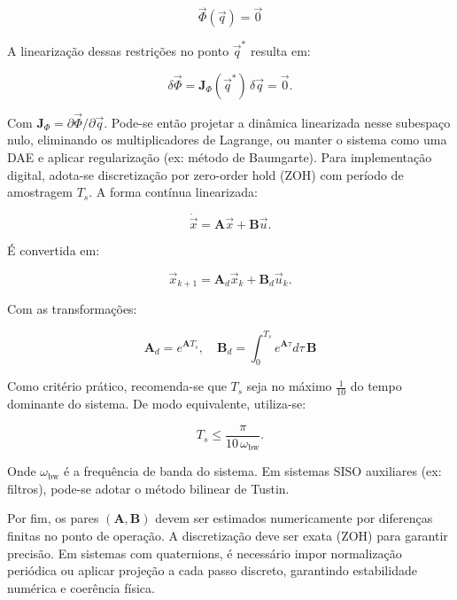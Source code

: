 \begin{equation}
\vec{\Phi}(\vec{q}) = \vec{0}
\label{eq:vinculo_phi}
\end{equation}

A linearização dessas restrições no ponto $\vec{q}^*$ resulta em:

\begin{equation}
\delta \vec{\Phi} = \mathbf{J}_{\Phi}(\vec{q}^*) \, \delta \vec{q} = \vec{0}.
\label{eq:linearizacao_vinculo}
\end{equation}

Com $\mathbf{J}_{\Phi} = \partial \vec{\Phi} / \partial \vec{q}$. Pode-se então projetar a dinâmica linearizada nesse subespaço nulo, eliminando os multiplicadores de Lagrange, ou manter o sistema como uma DAE e aplicar regularização (ex: método de Baumgarte).
Para implementação digital, adota-se discretização por zero-order hold (ZOH) com período de amostragem $T_s$. A forma contínua linearizada:

\begin{equation}
\dot{\vec{x}} = \mathbf{A} \vec{x} + \mathbf{B} \vec{u}.
\label{eq:sistema_linear_continuo}
\end{equation}

É convertida em:

\begin{equation}
\vec{x}_{k+1} = \mathbf{A}_d \vec{x}_k + \mathbf{B}_d \vec{u}_k.
\label{eq:sistema_discreto}
\end{equation}

Com as transformações:

\begin{equation}
\mathbf{A}_d = e^{\mathbf{A} T_s}, \quad \mathbf{B}_d = \int_0^{T_s} e^{\mathbf{A} \tau} d\tau \, \mathbf{B}
\label{eq:discretizacao_AdBd}
\end{equation}

Como critério prático, recomenda-se que $T_s$ seja no máximo $\frac{1}{10}$ do tempo dominante do sistema. De modo equivalente, utiliza-se:

\begin{equation}
T_s \leq \frac{\pi}{10 \, \omega_{\text{bw}}}.
\label{eq:criterio_Ts}
\end{equation}

Onde $\omega_{\text{bw}}$ é a frequência de banda do sistema. Em sistemas SISO auxiliares (ex: filtros), pode-se adotar o método bilinear de Tustin.

Por fim, os pares $(\mathbf{A}, \mathbf{B})$ devem ser estimados numericamente por diferenças finitas no ponto de operação. A discretização deve ser exata (ZOH) para garantir precisão. Em sistemas com quaternions, é necessário impor normalização periódica ou aplicar projeção a cada passo discreto, garantindo estabilidade numérica e coerência física.
